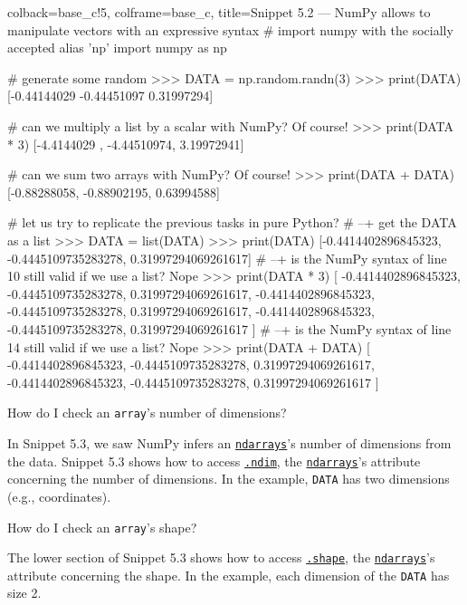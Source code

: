 \documentclass[a4paper,11pt]{book}
\numberwithin{figure}{chapter}
\numberwithin{table}{chapter}
\newcommand{\question}[1]{%
    \begin{tcolorbox}[colback=comp_c!10,colframe=comp_c,sidebyside align=top,width=\linewidth,before skip=1ex]
        #1
    \end{tcolorbox}
    \switchcolumn%
}
\newcommand{\note}[1]{%
    \begin{tcolorbox}[colback=white!0,colframe=white!10,width=\linewidth,before skip=1ex]
        #1
    \end{tcolorbox}
}
\begin{document}
\begin{pythoncode}[linenos=true,]{colback=base_c!5, colframe=base_c, title=\sffamily Snippet 5.2 --- NumPy allows to manipulate vectors with an expressive syntax}
# import numpy with the socially accepted alias 'np'
import numpy as np

# generate some random
>>> DATA = np.random.randn(3)
>>> print(DATA)
[-0.44144029 -0.44451097  0.31997294]

# can we multiply a list by a scalar with NumPy? Of course!
>>> print(DATA * 3)
[-4.4144029 , -4.44510974,  3.19972941]

# can we sum two arrays with NumPy? Of course!
>>> print(DATA + DATA) 
[-0.88288058, -0.88902195,  0.63994588]

# let us try to replicate the previous tasks in pure Python?
# --+ get the DATA as a list
>>> DATA = list(DATA)
>>> print(DATA)
[-0.4414402896845323, -0.4445109735283278, 0.31997294069261617]
# --+ is the NumPy syntax of line 10 still valid if we use a list? Nope
>>> print(DATA * 3) 
[
-0.4414402896845323, -0.4445109735283278, 0.31997294069261617,
-0.4414402896845323, -0.4445109735283278, 0.31997294069261617,
-0.4414402896845323, -0.4445109735283278, 0.31997294069261617
]
# --+ is the NumPy syntax of line 14 still valid if we use a list? Nope
>>> print(DATA + DATA) 
[
-0.4414402896845323, -0.4445109735283278, 0.31997294069261617,
-0.4414402896845323, -0.4445109735283278, 0.31997294069261617
]
\end{pythoncode}

\begin{paracol}{2}
	\question{\raggedright How do I check an \texttt{array}'s number of dimensions?}
	\note{In Snippet 5.3, we saw NumPy infers an \href{https://numpy.org/doc/stable/reference/arrays.ndarray.html}{\texttt{ndarrays}}'s number of dimensions from the data. Snippet 5.3 shows how to access \href{https://numpy.org/doc/stable/reference/generated/numpy.ndarray.ndim.html\#numpy.ndarray.ndim}{\texttt{.ndim}}, the \href{https://numpy.org/doc/stable/reference/arrays.ndarray.html}{\texttt{ndarrays}}'s attribute concerning the number of dimensions. In the example, \texttt{DATA} has two dimensions (e.g., coordinates).}
\end{paracol}

\begin{paracol}{2}
	\question{\raggedright How do I check an \texttt{array}'s shape?}
	\note{The lower section of Snippet 5.3 shows how to access \href{https://numpy.org/doc/stable/reference/generated/numpy.ndarray.shape.html\#numpy.ndarray.shape}{\texttt{.shape}}, the \href{https://numpy.org/doc/stable/reference/arrays.ndarray.html}{\texttt{ndarrays}}'s attribute concerning the shape. In the example, each dimension of the \texttt{DATA} has size 2.}
\end{paracol}
\clearpage
\end{document}
